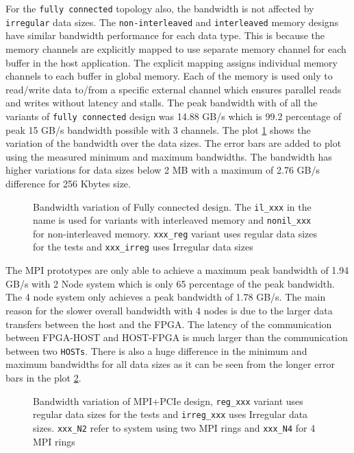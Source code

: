 For the \texttt{fully connected} topology also, the bandwidth is not affected by \texttt{irregular} data sizes.
The \texttt{non-interleaved} and \texttt{interleaved} memory designs have similar bandwidth performance for each data type.
This is because the memory channels are explicitly mapped to use separate memory channel for each buffer in the host application.
The explicit mapping assigns individual memory channels to each buffer in global memory. Each of the memory
is used only to read/write data to/from a specific external channel which ensures parallel reads
and writes without latency and stalls. The peak bandwidth with of all the variants of \texttt{fully connected}
design was 14.88 GB/s which is 99.2 percentage of peak 15 GB/s bandwidth possible with 3 channels.
The plot \ref{plot:fc} shows the variation of the bandwidth over the data sizes. The error bars are
added to plot using the measured minimum and maximum bandwidths. The bandwidth has higher variations
for data sizes below 2 MB with a maximum of 2.76 GB/s difference for 256 Kbytes size.

\begin{figure}[ht]
    \centering
    \scalebox{0.8}{}
    \caption{Bandwidth variation of Fully connected design.
    The \texttt{il\_xxx} in the name
    is used for variants with interleaved memory and \texttt{nonil\_xxx} for non-interleaved memory.
    \texttt{xxx\_reg} variant uses regular data sizes for the tests and \texttt{xxx\_irreg} uses Irregular data sizes}
    \label{plot:fc}
\end{figure}

The MPI prototypes are only able to achieve a maximum peak bandwidth of 1.94 GB/s with 2 Node system
which is only 65 percentage of the peak bandwidth. The 4 node system only achieves a peak bandwidth of
1.78 GB/s. The main reason for the slower overall bandwidth with 4 nodes is due to the larger
data transfers between the host and the FPGA. The latency of the communication between FPGA-HOST
and HOST-FPGA is much larger than the communication between two \texttt{HOSTs}. There is also a huge difference
in the minimum and maximum bandwidths for all data sizes as it can be seen from the longer error bars in the
plot \ref{plot:mpipcie}.

\begin{figure}[ht]
    \centering
    \scalebox{0.8}{}
    \caption{Bandwidth variation of MPI+PCIe design,
    \texttt{reg\_xxx} variant uses regular data sizes for the tests and \texttt{irreg\_xxx} uses Irregular data sizes.
    \texttt{xxx\_N2} refer to system using two MPI rings and \texttt{xxx\_N4} for 4 MPI rings}
    \label{plot:mpipcie}
\end{figure}


